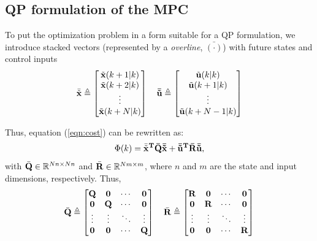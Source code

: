 \documentclass[twocolumn]{IEEEtran} %
\newcommand\real{\mathbb{R}}
\begin{document}
\subsection{QP formulation of the MPC}\label{sec:qp}
To put the optimization problem in a form suitable for a QP formulation, we introduce stacked vectors (represented by a {\em overline}, $\bar{(\cdot)}$) with future states and control inputs
\begin{equation*}
	\bar{\tilde{\bf x}} \triangleq \begin{bmatrix}
		\tilde{\bf x}(k+1|k) \\ \tilde{\bf x}(k+2|k) \\ \vdots \\ \tilde{\bf x}(k+N|k) 
	\end{bmatrix} \quad
	\bar{\tilde{\bf u}} \triangleq \begin{bmatrix}
		\tilde{\bf u}(k|k)  \\ \tilde{\bf u}(k+1|k) \\ \vdots \\ \tilde{\bf u}(k+N-1|k)
	\end{bmatrix}
\end{equation*}

Thus, equation (\ref{eqn:cost}) can be rewritten as:
\begin{equation}\label{eqn:cost2}
	\Phi(k) = \bar{\tilde{\bf x}}^T\bar{\bf Q}\bar{\tilde{\bf x}} + \bar{\tilde{\bf u}}^T\bar{\bf R}\bar{\tilde{\bf u}},
\end{equation}
with $\bar{\bf Q}\in\real^{Nn\times Nn}$ and $\bar{\bf R}\in\real^{Nm\times m}$, where $n$ and $m$ are the state and input dimensions, respectively. Thus,
\begin{equation*}
	\bar {\bf Q} \triangleq \begin{bmatrix}
		{\bf Q} & {\bf 0} & \cdots & {\bf 0} \\
		{\bf 0} & {\bf Q} & \cdots & {\bf 0} \\
		\vdots  & \vdots  & \ddots & \vdots  \\
		{\bf 0} & {\bf 0} & \cdots & {\bf Q}
	\end{bmatrix} \quad
	\bar {\bf R} \triangleq \begin{bmatrix}
		{\bf R} & {\bf 0} & \cdots & {\bf 0} \\
		{\bf 0} & {\bf R} & \cdots & {\bf 0} \\
		\vdots  & \vdots  & \ddots & \vdots  \\
		{\bf 0} & {\bf 0} & \cdots & {\bf R}
	\end{bmatrix}
\end{equation*}
\end{document}
